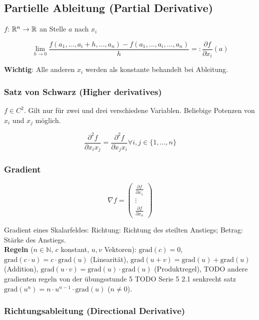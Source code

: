 \subsection{Partielle Ableitung (Partial Derivative)}

$f$: $\mathbb{R}^n \rightarrow \mathbb{R}$ an Stelle $a$ nach $x_i$

\[
    \lim_{h \rightarrow 0} \frac{f(a_1, ..., a_i + h, ..., a_n) - f(a_1, ..., a_i, ..., a_n)}{h} =: \frac{\partial f}{\partial x_i}(a)
\]

\textbf{Wichtig}: Alle anderen $x_i$ werden als konstante behandelt bei Ableitung.

\subsubsection{Satz von Schwarz (Higher derivatives)}

$f \in C^2$. Gilt nur für zwei und drei verschiedene Variablen. Beliebige Potenzen von $x_i$ und $x_j$ möglich.

\[
    \frac{\partial^2 f}{\partial x_i x_j} = \frac{\partial^2 f}{\partial x_j x_i} \forall i, j \in \{1, ..., n\}
\]


\subsubsection{Gradient}

\[
    \nabla f =
        \begin{pmatrix}
            \frac{\partial f}{\partial x_1}\\
            \vdots\\
            \frac{\partial f}{\partial x_n}
        \end{pmatrix}
\]

Gradient eines Skalarfeldes: Richtung: Richtung des steilten Anstiegs; Betrag: Stärke des Anstiegs.\\

\textbf{Regeln} ($n \in \mathbb{N}$, $c$ konstant, $u, v$ Vektoren):
$\text{grad}(c) = 0$,
$\text{grad}(c \cdot u) = c \cdot \text{grad}(u)$ (Linearität),
$\text{grad}(u + v) = \text{grad}(u) + \text{grad}(u)$ (Addition),
$\text{grad}(u \cdot v) = \text{grad}(u) \cdot \text{grad}(u)$
(Produktregel),
TODO andere gradienten regeln von der übungsstunde 5
TODO Serie 5 2.1 senkrecht satz 
$\text{grad}(u^n) = n \cdot u^{n-1} \cdot \text{grad}(u)$ ($n\neq 0$).

\subsubsection{Richtungsableitung (Directional Derivative)}

